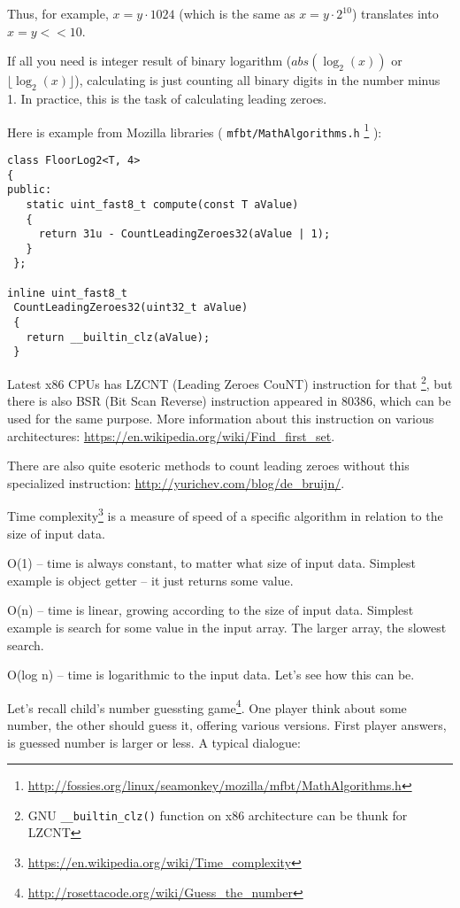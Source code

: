 Thus, for example, $x=y \cdot 1024$ (which is the same as $x=y \cdot 2^{10}$) translates into $x=y<<10$.


If all you need is integer result of binary logarithm ($abs(\log_2(x))$ or $\lfloor \log_2(x) \rfloor$), 
calculating is just counting all binary digits in the number minus 1.
In practice, this is the task of calculating leading zeroes.

Here is example from Mozilla libraries ( \texttt{mfbt/MathAlgorithms.h}
\footnote{\url{http://fossies.org/linux/seamonkey/mozilla/mfbt/MathAlgorithms.h}} ):

\begin{lstlisting}[caption=Mozilla libraries,style=customc]
class FloorLog2<T, 4>
{
public:
   static uint_fast8_t compute(const T aValue)
   {
     return 31u - CountLeadingZeroes32(aValue | 1);
   }
 };

inline uint_fast8_t
 CountLeadingZeroes32(uint32_t aValue)
 {
   return __builtin_clz(aValue);
 }
\end{lstlisting}

Latest x86 CPUs has LZCNT (Leading Zeroes CouNT) instruction for that
\footnote{GNU \texttt{\_\_builtin\_clz()} function on x86 architecture can be thunk for LZCNT}, 
but there is also BSR (Bit Scan Reverse) instruction appeared in 80386, which can be used for the same purpose.
More information about this instruction on various architectures: \url{https://en.wikipedia.org/wiki/Find_first_set}.

There are also quite esoteric methods to count leading zeroes without this specialized instruction: \url{http://yurichev.com/blog/de_bruijn/}.


Time complexity\footnote{\url{https://en.wikipedia.org/wiki/Time_complexity}} is a measure of speed of a specific algorithm 
in relation to the size of input data.

O(1) -- time is always constant, to matter what size of input data. Simplest example is object getter -- it just returns some value.

O(n) -- time is linear, growing according to the size of input data. Simplest example is search for some value in the input array.
The larger array, the slowest search.

O(log n) -- time is logarithmic to the input data.
Let's see how this can be.

Let's recall child's number guessting game\footnote{\url{http://rosettacode.org/wiki/Guess_the_number}}.
One player think about some number, the other should guess it, offering various versions.
First player answers, is guessed number is larger or less.
A typical dialogue:

